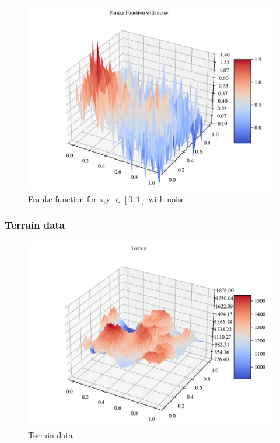 \begin{figure}[h!]
\centering
\includegraphics[width=1\linewidth]{project_1_alt/figures/data/franke_func_noise.pdf}
\caption{Franke function for x,y $\in [0,1]$ with noise }
\label{franke_noise}
\end{figure}


\subsubsection{Terrain data}

\begin{figure}
    \centering
    \includegraphics[width=1\linewidth]{project_1_alt/figures/data/terrain_data.pdf}
    \caption{Terrain data}
    \label{data:terrain}
\end{figure}

